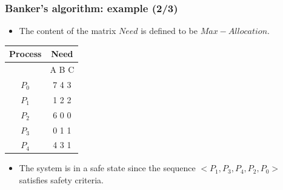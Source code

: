 \documentclass[CJKutf8,xcolor=pdftex,dvipsnames,table]{beamer}
\begin{document}
\begin{CJK*}{UTF8}{song}
  \begin{frame}
  \frametitle{Banker's algorithm: example (2/3)} \pause
  \begin{itemize}
  \item{The content of the matrix $Need$ is defined to be $Max - Allocation$.} \pause
  \end{itemize}
  \begin{tabular}{cc}
    Process & Need\\
    \hline
            & A B C\\
    $P_0$   & 7 4 3\\
    $P_1$   & 1 2 2\\
    $P_2$   & 6 0 0\\
    $P_3$   & 0 1 1\\
    $P_4$   & 4 3 1\\
  \end{tabular} \pause
  \begin{itemize}
  \item{The system is in a safe state since the sequence $<P_1, P_3, P_4, P_2, P_0>$ satisfies safety criteria.}
  \end{itemize}
  \end{frame}


\end{CJK*}
\end{document}
